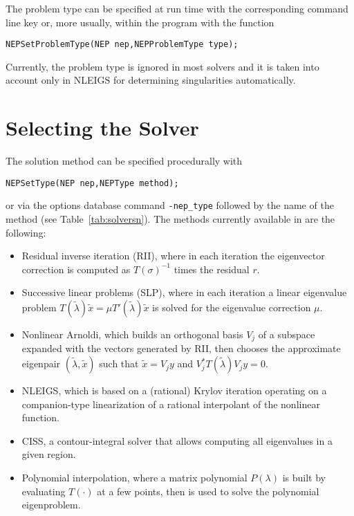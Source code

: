 The problem type can be specified at run time with the corresponding command line key or, more usually, within the program with the function
	\begin{Verbatim}[fontsize=\small]
	NEPSetProblemType(NEP nep,NEPProblemType type);
	\end{Verbatim}
Currently, the problem type is ignored in most solvers and it is taken into account only in NLEIGS for determining singularities automatically.

\section{Selecting the Solver}

The solution method can be specified procedurally with
	\begin{Verbatim}[fontsize=\small]
	NEPSetType(NEP nep,NEPType method);
	\end{Verbatim}
or via the options database command \Verb!-nep_type! followed by the name of the method (see Table~\ref{tab:solversn}). The methods currently available in  are the following:
\begin{itemize}
\item Residual inverse iteration (RII), where in each iteration the eigenvector correction is computed as $T(\sigma)^{-1}$ times the residual $r$.
\item Successive linear problems (SLP), where in each iteration a linear eigenvalue problem $T(\tilde\lambda)\tilde x=\mu T'(\tilde\lambda)\tilde x$ is solved for the eigenvalue correction $\mu$.
\item Nonlinear Arnoldi, which builds an orthogonal basis $V_j$ of a subspace expanded with the vectors generated by RII, then chooses the approximate eigenpair $(\tilde\lambda,\tilde x)$ such that $\tilde x=V_jy$ and $V_j^*T(\tilde\lambda)V_jy=0$.
\item NLEIGS, which is based on a (rational) Krylov iteration operating on a companion-type linearization of a rational interpolant of the nonlinear function.
\item CISS, a contour-integral solver that allows computing all eigenvalues in a given region.
\item Polynomial interpolation, where a matrix polynomial $P(\lambda)$ is built by evaluating $T(\cdot)$ at a few points, then  is used to solve the polynomial eigenproblem.
\end{itemize}

